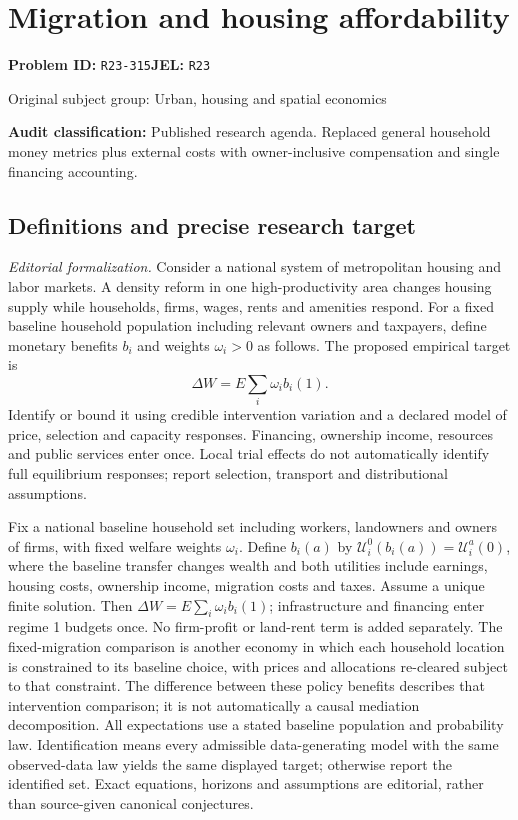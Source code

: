 \documentclass[11pt,a4paper]{article}
\begin{document}
\section*{Migration and housing affordability}
\textbf{Problem ID:} \texttt{R23-315}\quad \textbf{JEL:} \texttt{R23}\par
\label{problem:OP-0461}
{\sffamily\small\color{muted}Original subject group: Urban, housing and spatial economics\par}
\label{definitions:problem:30007743}
\textbf{Audit classification:} Published research agenda. Replaced general household money metrics plus external costs with owner-inclusive compensation and single financing accounting.
\subsection*{Definitions and precise research target}
\textit{Editorial formalization.} Consider a national system of metropolitan housing and labor markets. A density reform in one high-productivity area changes housing supply while households, firms, wages, rents and amenities respond. For a fixed baseline household population including relevant owners and taxpayers, define monetary benefits \(b_i\) and weights \(\omega_i>0\) as follows. The proposed empirical target is \[\Delta W=E\sum_i\omega_i b_i(1).\] Identify or bound it using credible intervention variation and a declared model of price, selection and capacity responses. Financing, ownership income, resources and public services enter once. Local trial effects do not automatically identify full equilibrium responses; report selection, transport and distributional assumptions.

Fix a national baseline household set including workers, landowners and owners of firms, with fixed welfare weights \(\omega_i\). Define \(b_i(a)\) by \(\mathcal U_i^0(b_i(a))=\mathcal U_i^a(0)\), where the baseline transfer changes wealth and both utilities include earnings, housing costs, ownership income, migration costs and taxes. Assume a unique finite solution. Then \(\Delta W=E\sum_i\omega_i b_i(1)\); infrastructure and financing enter regime 1 budgets once. No firm-profit or land-rent term is added separately. The fixed-migration comparison is another economy in which each household location is constrained to its baseline choice, with prices and allocations re-cleared subject to that constraint. The difference between these policy benefits describes that intervention comparison; it is not automatically a causal mediation decomposition. All expectations use a stated baseline population and probability law. Identification means every admissible data-generating model with the same observed-data law yields the same displayed target; otherwise report the identified set. Exact equations, horizons and assumptions are editorial, rather than source-given canonical conjectures.
\end{document}
